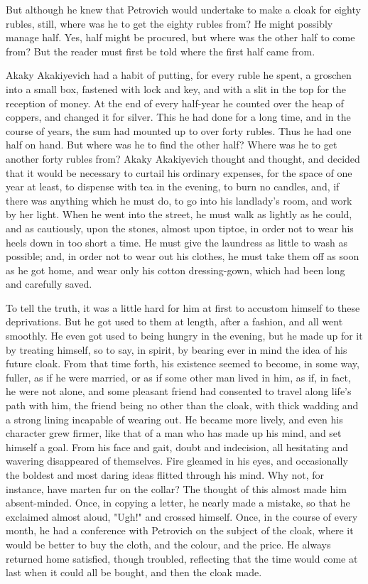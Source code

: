 But although he knew that Petrovich would undertake to make a cloak
for eighty rubles, still, where was he to get the eighty rubles from?
He might possibly manage half. Yes, half might be procured, but where
was the other half to come from? But the reader must first be told
where the first half came from.

Akaky Akakiyevich had a habit of putting, for every ruble he spent, a
groschen into a small box, fastened with lock and key, and with a slit
in the top for the reception of money. At the end of every half-year
he counted over the heap of coppers, and changed it for silver. This
he had done for a long time, and in the course of years, the sum had
mounted up to over forty rubles. Thus he had one half on hand. But
where was he to find the other half? Where was he to get another forty
rubles from? Akaky Akakiyevich thought and thought, and decided that
it would be necessary to curtail his ordinary expenses, for the space
of one year at least, to dispense with tea in the evening, to burn no
candles, and, if there was anything which he must do, to go into his
landlady's room, and work by her light. When he went into the street,
he must walk as lightly as he could, and as cautiously, upon the
stones, almost upon tiptoe, in order not to wear his heels down in too
short a time. He must give the laundress as little to wash as
possible; and, in order not to wear out his clothes, he must take them
off as soon as he got home, and wear only his cotton dressing-gown,
which had been long and carefully saved.

To tell the truth, it was a little hard for him at first to accustom
himself to these deprivations. But he got used to them at length,
after a fashion, and all went smoothly. He even got used to being
hungry in the evening, but he made up for it by treating himself, so
to say, in spirit, by bearing ever in mind the idea of his future
cloak. From that time forth, his existence seemed to become, in some
way, fuller, as if he were married, or as if some other man lived in
him, as if, in fact, he were not alone, and some pleasant friend had
consented to travel along life's path with him, the friend being no
other than the cloak, with thick wadding and a strong lining incapable
of wearing out. He became more lively, and even his character grew
firmer, like that of a man who has made up his mind, and set himself a
goal. From his face and gait, doubt and indecision, all hesitating and
wavering disappeared of themselves. Fire gleamed in his eyes, and
occasionally the boldest and most daring ideas flitted through his
mind. Why not, for instance, have marten fur on the collar? The
thought of this almost made him absent-minded. Once, in copying a
letter, he nearly made a mistake, so that he exclaimed almost aloud,
"Ugh!" and crossed himself. Once, in the course of every month, he had
a conference with Petrovich on the subject of the cloak, where it
would be better to buy the cloth, and the colour, and the price. He
always returned home satisfied, though troubled, reflecting that the
time would come at last when it could all be bought, and then the
cloak made.


